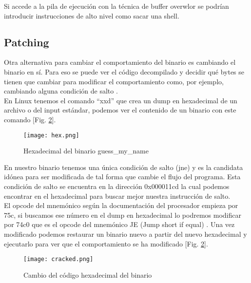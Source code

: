 \documentclass[10pt,a4paper]{article}
\begin{document}
Si accede a la pila de ejecución con la técnica de buffer overwlor se podrían introducir instrucciones de alto nivel como sacar una shell.

\subsection{Patching}
Otra alternativa para cambiar el comportamiento del binario es cambiando el binario en sí. Para eso se puede ver el código decompilado y decidir qué bytes se tienen que cambiar para modificar el comportamiento como, por ejemplo, cambiando alguna condición de salto \cite{patching}.\\
En Linux tenemos el comando ``xxd'' que crea un dump en hexadecimal de un archivo o del input estándar, podemos ver el contenido de un binario con este comando [Fig. \ref{fig:hex}].

\begin{figure}[h!]
  \centering
  \texttt{[image: hex.png]}\\
  \caption{Hexadecimal del binario guess\_my\_name}
  \label{fig:hex}
\end{figure}

En nuestro binario tenemos una única condición de salto (jne) y es la candidata idónea para ser modificada de tal forma que cambie el flujo del programa. Esta condición de salto se encuentra en la dirección 0x000011cd la cual podemos encontrar en el hexadecimal para buscar mejor nuestra instrucción de salto.\\

El opcode del mnemónico según la documentación del procesador empieza por 75c, si buscamos ese número en el dump en hexadecimal lo podremos modificar por 74c0 que es el opcode del mnemónico JE (Jump short if equal) \cite{opcode}. Una vez modificado podemos restaurar un binario nuevo a partir del nuevo hexadecimal y ejecutarlo para ver que el comportamiento se ha modificado [Fig. \ref{fig:hex}].

\begin{figure}[h!]
  \centering
  \texttt{[image: cracked.png]}\\
  \caption{Cambio del código hexadecimal del binario}
  \label{fig:hex}
\end{figure}

\pagebreak
\end{document}
